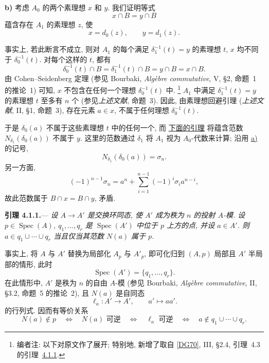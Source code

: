 
\medskip
{}\label{proof:sga3-V-4.1-b}%
\noindent\textbf{b)} 考虑 \(A_0\) 的两个素理想 \(x\) 和 \(y\).
我们证明等式
\[
  x\cap B=y\cap B
\]
蕴含存在 \(A_1\) 的素理想 \(z\), 使
\[
  x=d_0(z),\qquad y=d_1(z).
\]

事实上, 若此断言不成立, 则对 \(A_1\) 的每个满足
\(\delta_1^{-1}(t)=y\) 的素理想 \(t\),
\(x\) 均不同于 \(\delta_0^{-1}(t)\).
对每个这样的 \(t\), 都有
\[
  \delta_0^{-1}(t)\cap B
  =\delta_1^{-1}(t)\cap B
  =y\cap B=x\cap B.
\]
由 Cohen--Seidenberg 定理 (参见 Bourbaki,
\emph{Alg\`ebre commutative}, V, \S2, 命题~1 的推论~1)
可知, \(x\) 不包含在任何一个理想 \(\delta_0^{-1}(t)\) 中.%
\footnote{\label{note:sga3-V-21}编者注: 以下对原文作了展开;
特别地, 新增了取自 \hyperref[bib:sga3-V-DG70]{[DG70]}, III,
\S2.4, 引理~4.3 的引理~\hyperref[lem:sga3-V-4.1.1]{4.1.1}.}
\(A_1\) 中满足 \(\delta_1^{-1}(t)=y\) 的素理想 \(t\) 至多有 \(n\) 个
(参见\emph{上述文献}, 命题~3).
因此, 由素理想回避引理 (\emph{上述文献}, II, \S1, 命题~3),
存在元素 \(a\in x\), 不属于任何理想 \(\delta_0^{-1}(t)\).

于是 \(\delta_0(a)\) 不属于这些素理想 \(t\) 中的任何一个,
而 \hyperref[lem:sga3-V-4.1.1]{下面的引理} 将蕴含范数
\(N_{\delta_1}(\delta_0(a))\) 不属于 \(y\).
这里的范数通过 \(\delta_1\) 将 \(A_1\) 视为 \(A_0\)-代数来计算;
沿用 \hyperref[proof:sga3-V-4.1-a]{a)} 的记号,
\[
  N_{\delta_1}(\delta_0(a))=\sigma_n.
\]
另一方面,
\[
  (-1)^{n-1}\sigma_n
  =a^n+\sum_{i=1}^{n-1}(-1)^i\sigma_i a^{n-i},
\]
故此范数属于 \(B\cap x=B\cap y\), 矛盾.

\medskip
{}\label{lem:sga3-V-4.1.1}%
\noindent\textbf{引理 4.1.1.}---
\textit{设 \(A\to A'\) 是交换环同态, 使 \(A'\) 成为秩为 \(n\)
的投射 \(A\)-模. 设 \(p\in\operatorname{Spec}(A)\),
\(q_1,\ldots,q_r\) 是 \(\operatorname{Spec}(A')\) 中位于 \(p\)
上方的点, 并设 \(a\in A'\). 则 \(a\in q_1\cup\cdots\cup q_r\)
当且仅当其范数 \(N(a)\) 属于 \(p\).}

事实上, 将 \(A\) 与 \(A'\) 替换为局部化 \(A_p\) 与 \(A'_p\),
即可化归到 \((A,p)\) 局部且 \(A'\) 半局部的情形, 此时
\[
  \operatorname{Spec}(A')=\{q_1,\ldots,q_r\}.
\]
在此情形中, \(A'\) 是秩为 \(n\) 的自由 \(A\)-模
(参见 Bourbaki, \emph{Alg\`ebre commutative}, II, \S3.2, 命题~5 的推论~2),
且 \(N(a)\) 是自同态
\[
  \ell_a:A'\longrightarrow A',\qquad a'\longmapsto aa'.
\]
的行列式. 因而有等价关系
\[
  N(a)\notin p
  \quad\Longleftrightarrow\quad N(a)\text{ 可逆}
  \quad\Longleftrightarrow\quad \ell_a\text{ 可逆}
  \quad\Longleftrightarrow\quad
  a\notin q_1\cup\cdots\cup q_r.
\]
